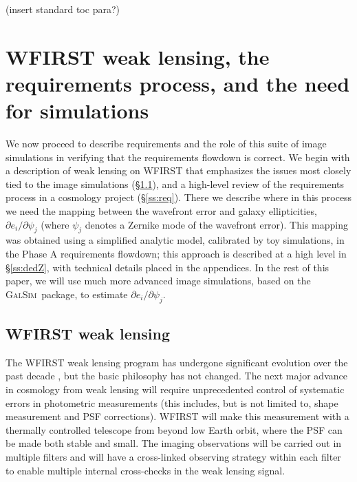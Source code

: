 \documentclass[aps,prd, amsmath,amssymb,superscriptaddress,showkeys,nofootinbib,reprint,preprintnumbers]{revtex4-1}
\newcommand{\galsim}{\textsc{GalSim}}
\begin{document}
(insert standard toc para?) 

\section{WFIRST weak lensing, the requirements process, and the need for simulations}
\label{sec:wfirst}

We now proceed to describe requirements and the role of this suite of image simulations in verifying that the requirements flowdown is correct. We begin with a description of weak lensing on WFIRST that emphasizes the issues most closely tied to the image simulations (\S\ref{ss:wlprog}), and a high-level review of the requirements process in a cosmology project (\S\ref{ss:req}). There we describe where in this process we need the mapping between the wavefront error and galaxy ellipticities, $\partial e_i/\partial \psi_j$ (where $\psi_j$ denotes a Zernike mode of the wavefront error). This mapping was obtained using a simplified analytic model, calibrated by toy simulations, in the Phase A requirements flowdown; this approach is described at a high level in \S\ref{ss:dedZ}, with technical details placed in the appendices. In the rest of this paper, we will use much more advanced image simulations, based on the \galsim\ package, to estimate $\partial e_i/\partial \psi_j$.

\subsection{WFIRST weak lensing}
\label{ss:wlprog}

The WFIRST weak lensing program has undergone significant evolution over the past decade \cite{2011arXiv1108.1374G, 2012arXiv1208.4012G, 2013arXiv1305.5422S, 2015arXiv150303757S, 2018arXiv180403628D, 2019arXiv190205569A}, but the basic philosophy has not changed. The next major advance in cosmology from weak lensing will require unprecedented control of systematic errors in photometric measurements (this includes, but is not limited to, shape measurement and PSF corrections). WFIRST will make this measurement with a thermally controlled telescope from beyond low Earth orbit, where the PSF can be made both stable and small. The imaging observations will be carried out in multiple filters and will have a cross-linked observing strategy within each filter to enable multiple internal cross-checks in the weak lensing signal.
\end{document}
